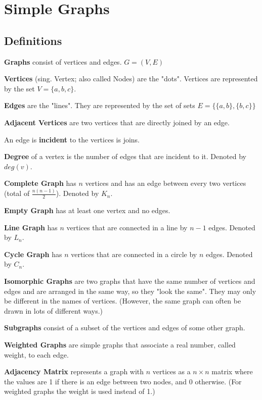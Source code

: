 \documentclass[../main.tex]{subfiles}
\begin{document}
\section{Simple Graphs}

\subsection{Definitions}

\textbf{Graphs} consist of vertices and edges. $G = (V, E)$

\textbf{Vertices} (sing. Vertex; also called Nodes) are the "dots". Vertices are represented by the set $V = \{a, b, c\}$.

\textbf{Edges} are the "lines". They are represented by the set of sets $E = \{\{a, b\}, \{b, c\}\}$

\textbf{Adjacent Vertices} are two vertices that are directly joined by an edge.

An edge is \textbf{incident} to the vertices is joins.

\textbf{Degree} of a vertex is the number of edges that are incident to it. Denoted by $deg(v)$.

\textbf{Complete Graph} has $n$ vertices and has an edge between every two vertices (total of $\frac{n(n-1)}{2}$). Denoted by $K_n$.

\textbf{Empty Graph} has at least one vertex and no edges.

\textbf{Line Graph} has $n$ vertices that are connected in a line by $n-1$ edges. Denoted by $L_n$.

\textbf{Cycle Graph} has $n$ vertices that are connected in a circle by $n$ edges. Denoted by $C_n$.

\textbf{Isomorphic Graphs} are two graphs that have the same number of vertices and edges and are arranged in the same way, so they "look the same". They may only be different in the names of vertices. (However, the same graph can often be drawn in lots of different ways.)

\textbf{Subgraphs} consist of a subset of the vertices and edges of some other graph.

\textbf{Weighted Graphs} are simple graphs that associate a real number, called weight, to each edge.

\textbf{Adjacency Matrix} represents a graph with $n$ vertices as a $n \times n$ matrix where the values are 1 if there is an edge between two nodes, and 0 otherwise. (For weighted graphs the weight is used instead of 1.)
\end{document}
